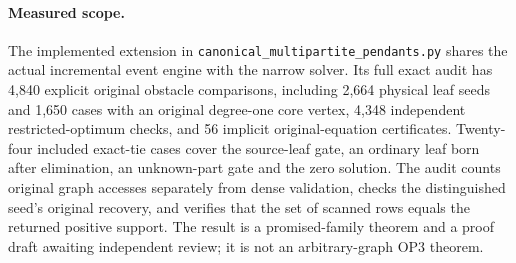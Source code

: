 \paragraph{Measured scope.}
The implemented extension in
\nolinkurl{canonical_multipartite_pendants.py} shares the actual incremental
event engine with the narrow solver. Its full exact audit has 4,840 explicit
original obstacle comparisons, including 2,664 physical leaf seeds and
1,650 cases with an original degree-one core vertex, 4,348 independent
restricted-optimum checks, and 56 implicit original-equation certificates.
Twenty-four included exact-tie cases cover the source-leaf gate, an ordinary
leaf born after elimination, an unknown-part gate and the zero solution.
The audit counts original graph accesses separately from dense validation,
checks the distinguished seed's original recovery, and verifies that the
set of scanned rows equals the returned positive support. The result is
a promised-family theorem and a proof draft awaiting independent review;
it is not an arbitrary-graph OP3 theorem.
